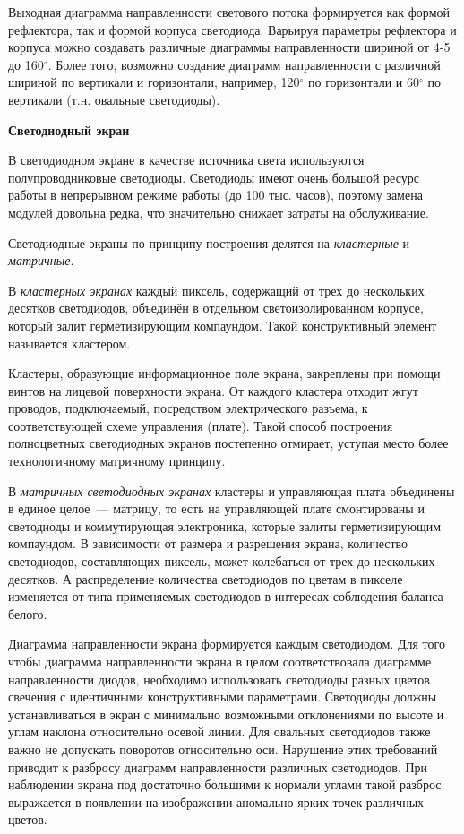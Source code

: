 Выходная диаграмма направленности светового потока формируется как формой рефлектора, так и формой корпуса светодиода. Варьируя параметры рефлектора и корпуса можно создавать различные диаграммы направленности шириной от 4-5 до 160$ ^\circ $. Более того, возможно создание диаграмм направленности с различной шириной по вертикали и горизонтали, например, 120$ ^\circ $ по горизонтали и 60$ ^\circ $ по вертикали (т.н. овальные светодиоды). 

\begin{flushleft}
\textbf{Светодиодный экран}
\end{flushleft}

В светодиодном экране в качестве источника света используются полупроводниковые светодиоды. Светодиоды имеют очень большой ресурс работы в непрерывном режиме работы (до 100 тыс. часов), поэтому замена модулей довольна редка, что значительно снижает затраты на обслуживание.

Светодиодные экраны по принципу построения делятся на \textit{кластерные} и \textit{матричные}.

В \textit{кластерных экранах} каждый пиксель, содержащий от трех до нескольких десятков светодиодов, объединён в отдельном светоизолированном корпусе, который залит герметизирующим компаундом. Такой конструктивный элемент называется кластером.

Кластеры, образующие информационное поле экрана, закреплены при помощи винтов на лицевой поверхности экрана. От каждого кластера отходит жгут проводов, подключаемый, посредством электрического разъема, к соответствующей схеме управления (плате). Такой способ построения полноцветных светодиодных экранов постепенно отмирает, уступая место более технологичному матричному принципу.

В \textit{матричных светодиодных экранах} кластеры и управляющая плата объединены в единое целое~--- матрицу, то есть на управляющей плате смонтированы и светодиоды и коммутирующая электроника, которые залиты герметизирующим компаундом. В зависимости от размера и разрешения экрана, количество светодиодов, составляющих пиксель, может колебаться от трех до нескольких десятков. А распределение количества светодиодов по цветам в пикселе изменяется от типа применяемых светодиодов в интересах соблюдения баланса белого.

Диаграмма направленности экрана формируется каждым светодиодом. Для того чтобы диаграмма направленности экрана в целом соответствовала диаграмме направленности диодов, необходимо использовать светодиоды разных цветов свечения с идентичными конструктивными параметрами. Светодиоды должны устанавливаться в экран с минимально возможными отклонениями по высоте и углам наклона относительно осевой линии. Для овальных светодиодов также важно не допускать поворотов относительно оси. Нарушение этих требований приводит к разбросу диаграмм направленности различных светодиодов. При наблюдении экрана под достаточно большими к нормали углами такой разброс выражается в появлении на изображении аномально ярких точек различных цветов. 


